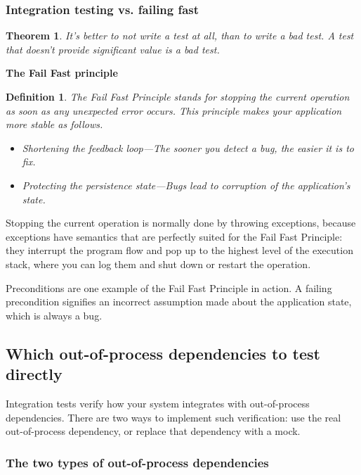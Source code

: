 \documentclass{article}
\newtheorem{definition}{Definition}
\newtheorem{theorem}{Theorem}
\begin{document}
\subsubsection{Integration testing vs. failing fast}

\begin{theorem}
It’s better to not write a test at all, than to write a bad test. A test that doesn’t provide significant value is a bad test.
\end{theorem}

\textbf{The Fail Fast principle}

\begin{definition}
The Fail Fast Principle stands for stopping the current operation as soon as any unexpected error occurs. This principle makes your application more stable as follows.

\begin{itemize}
	\item  Shortening the feedback loop—The sooner you detect a bug, the easier it is to fix. 
	\item  Protecting the persistence state—Bugs lead to corruption of the application’s state.
\end{itemize}
\end{definition}

Stopping the current operation is normally done by throwing exceptions, because exceptions have semantics that are perfectly suited for the Fail Fast Principle: they interrupt the program flow and pop up to the highest level of the execution stack, where you can log them and shut down or restart the operation.

Preconditions are one example of the Fail Fast Principle in action. A failing precondition signifies an incorrect assumption made about the application state, which is always a bug. 

\subsection{ Which out-of-process dependencies to test directly}

Integration tests verify how your system integrates with out-of-process dependencies. There are two ways to implement such verification: use the real out-of-process dependency, or replace that dependency with a mock. 

\subsubsection{The two types of out-of-process dependencies}
\end{document}
